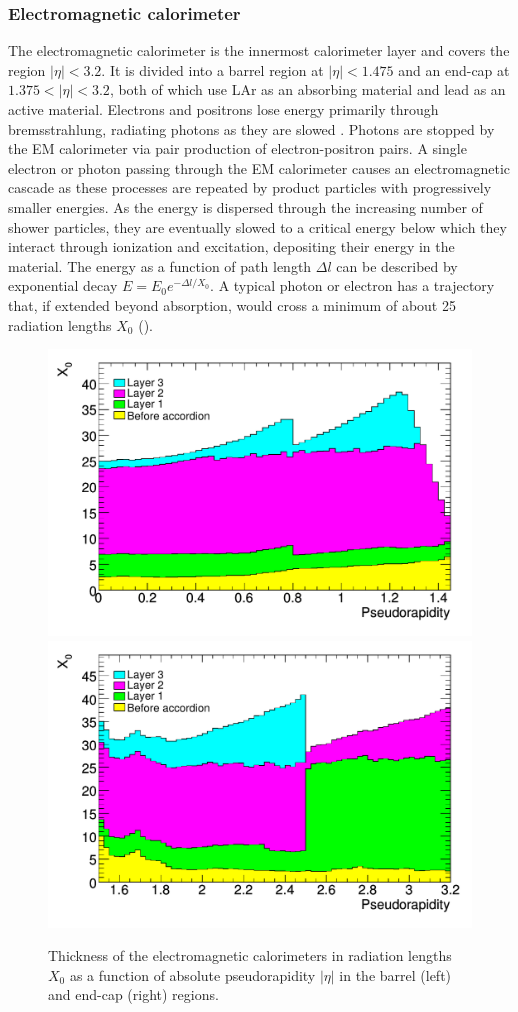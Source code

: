 \subsubsection{Electromagnetic calorimeter}

The electromagnetic calorimeter is the innermost calorimeter layer and covers the region $|\eta| < 3.2$.
It is divided into a barrel region at $|\eta| < 1.475$ and an end-cap at $1.375 < |\eta| < 3.2$, both of which use \ac{LAr} as an absorbing material \cite{ATLAS:1996ab} and lead as an active material. %
Electrons and positrons lose energy primarily through bremsstrahlung, radiating photons as they are slowed \cite{Fabjan:2003aq}.
Photons are stopped by the \ac{EM} calorimeter via pair production of electron-positron pairs.
A single electron or photon passing through the \ac{EM} calorimeter causes an electromagnetic cascade as these processes are repeated by product particles with progressively smaller energies.
As the energy is dispersed through the increasing number of shower particles, they are eventually slowed to a critical energy below which they interact through ionization and excitation, depositing their energy in the material.
The energy as a function of path length $\Delta l$ can be described by exponential decay \(E = E_0 e^{-\Delta l / X_0} \).
A typical photon or electron has a trajectory that, if extended beyond absorption, would cross a minimum of about 25 radiation lengths $X_0$ ().

\begin{figure}[t]
\includegraphics[width=0.49\linewidth]{x0_layers_barrel.pdf}
\includegraphics[width=0.49\linewidth]{x0_layers_endcap.pdf}
\caption{Thickness of the electromagnetic calorimeters in radiation lengths $X_0$ as a function of absolute pseudorapidity $|\eta|$ in the barrel (left) and end-cap (right) regions.}
\label{fig:atlas_em_rad_length}
\end{figure}

